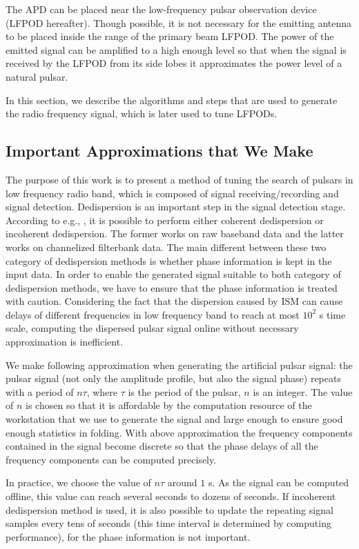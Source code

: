 \documentclass[fleqn,usenatbib]{mnras}
\begin{document}
The APD can be placed near the low-frequency pulsar observation device (LFPOD hereafter). 
Though possible, it is not necessary for the emitting antenna to be placed inside the range of the primary beam LFPOD.
The power of the emitted signal can be amplified to a high enough level so that when the signal is received by the LFPOD from its side lobes it approximates the power level of a natural pulsar.

In this section, we describe the algorithms and steps that are used to generate the radio frequency signal, which is later used to tune LFPODs.

\subsection{Important Approximations that We Make}
The purpose of this work is to present a method of tuning the search of pulsars in low frequency radio band, which is composed of signal receiving/recording and signal detection.
Dedispersion is an important step in the signal detection stage.
According to e.g., \citet{2012hpa..book.....L}, it is possible to perform either coherent dedispersion or incoherent dedispersion. The former works on raw baseband data and the latter works on channelized filterbank data. 
The main different between these two category of dedispersion methods is whether phase information is kept in the input data.
In order to enable the generated signal suitable to both category of dedispersion methods, we have to ensure that the phase information is treated with caution.
Considering the fact that the dispersion caused by ISM can cause delays of different frequencies in low frequency band to reach at most $10^2$ s time scale, computing the dispersed pulsar signal online without necessary approximation is inefficient.

We make following approximation when generating the artificial pulsar signal: the pulsar signal (not only the amplitude profile, but also the signal phase) repeats with a period of $n\tau$, where $\tau$ is the period of the pulsar, $n$ is an integer. The value of $n$ is chosen so that it is affordable by the computation resource of the workstation that we use to generate the signal and large enough to ensure good enough statistics in folding. 
With above approximation the frequency components contained in the signal become discrete so that the phase delays of all the frequency components can be computed precisely.

In practice, we choose the value of $n\tau$ around $1$ s.
As the signal can be computed offline, this value can reach several seconds to dozens of seconds.
If incoherent dedispersion method is used, it is also possible to update the repeating signal samples every tens of seconds (this time interval is determined by computing performance), for the phase information is not important. 
\end{document}
